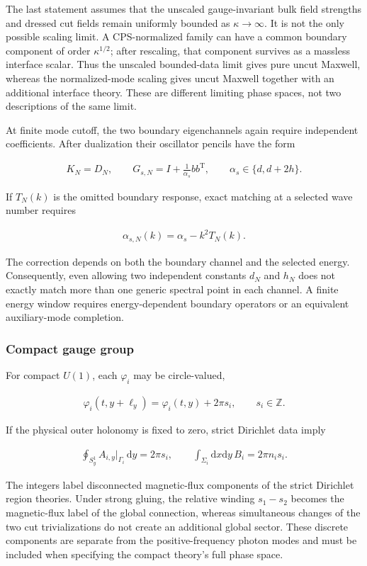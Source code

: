 The last statement assumes that the unscaled gauge-invariant bulk field strengths and dressed cut fields remain uniformly bounded as $\kappa\to\infty$. It is not the only possible scaling limit. A CPS-normalized family can have a common boundary component of order $\kappa^{1/2}$; after rescaling, that component survives as a massless interface scalar. Thus the unscaled bounded-data limit gives pure uncut Maxwell, whereas the normalized-mode scaling gives uncut Maxwell together with an additional interface theory. These are different limiting phase spaces, not two descriptions of the same limit.

At finite mode cutoff, the two boundary eigenchannels again require independent coefficients. After dualization their oscillator pencils have the form

\begin{align}
K_N=D_N,
\qquad
G_{s,N}=I+\frac1{\alpha_s}bb^{\mathrm T},
\qquad
\alpha_s\in\{d,d+2h\}.
\end{align}

If $T_N(k)$ is the omitted boundary response, exact matching at a selected wave number requires

\begin{align}
\alpha_{s,N}(k)=\alpha_s-k^2T_N(k).
\end{align}

The correction depends on both the boundary channel and the selected energy. Consequently, even allowing two independent constants $d_N$ and $h_N$ does not exactly match more than one generic spectral point in each channel. A finite energy window requires energy-dependent boundary operators or an equivalent auxiliary-mode completion.

\subsubsection{Compact gauge group}\label{compact-gauge-group}

For compact $U(1)$, each $\varphi_i$ may be circle-valued,

\begin{align}
\varphi_i(t,y+\ell_y)
=\varphi_i(t,y)+2\pi s_i,
\qquad
s_i\in\mathbb Z.
\end{align}

If the physical outer holonomy is fixed to zero, strict Dirichlet data imply

\begin{align}
\oint_{S_y^1}A_{i,y}\big|_{\Gamma_i}\,\mathrm dy=2\pi s_i,
\qquad
\int_{\Sigma_i}\mathrm dx\mathrm dy\,B_i=2\pi n_i s_i.
\end{align}

The integers label disconnected magnetic-flux components of the strict Dirichlet region theories. Under strong gluing, the relative winding $s_1-s_2$ becomes the magnetic-flux label of the global connection, whereas simultaneous changes of the two cut trivializations do not create an additional global sector. These discrete components are separate from the positive-frequency photon modes and must be included when specifying the compact theory's full phase space.

